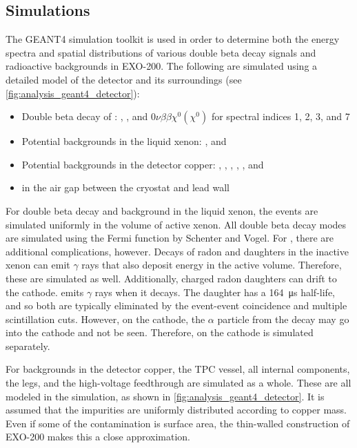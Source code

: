 \documentclass[herrin-thesis.tex]{subfiles}
\begin{document}
\subsection{Simulations}
\label{sec:analysis_simulations}
The GEANT4 simulation toolkit\cite{Agostinelli:2003fk} is used in order to determine both the energy spectra and spatial distributions of various double beta decay signals and radioactive backgrounds in EXO-200. The following are simulated using a detailed model of the detector and its surroundings (see \cref{fig:analysis_geant4_detector}):
\begin{itemize}
\item Double beta decay of :
	\twonu{},
	\zeronu{},
	and \(0\nu\beta\beta\chi^{0}(\chi^{0})\) for spectral indices 1, 2, 3, and 7
\item Potential backgrounds in the liquid xenon:
	,
	and 
\item Potential backgrounds in the detector copper:
	, 
	,
	,
	,
	,
	and 
\item {} in the air gap between the cryostat and lead wall
\end{itemize}

For double beta decay and background in the liquid xenon, the events are simulated uniformly in the volume of active xenon. All double beta decay modes are simulated using the Fermi function by Schenter and Vogel\cite{Schenter:1983uq}. For , there are additional complications, however. Decays of radon and daughters in the inactive xenon can emit \(\gamma\) rays that also deposit energy in the active volume. Therefore, these are simulated as well. Additionally, charged radon daughters can drift to the cathode.  emits \(\gamma\) rays when it decays. The daughter  has a \SI{164}{\micro\s} half-life, and so both are typically eliminated by the event-event coincidence and multiple scintillation cuts. However, on the cathode, the \(\alpha\) particle from the  decay may go into the cathode and not be seen. Therefore,  on the cathode is simulated separately.

For backgrounds in the detector copper, the TPC vessel, all internal components, the legs, and the high-voltage feedthrough are simulated as a whole. These are all modeled in the simulation, as shown in \cref{fig:analysis_geant4_detector}. It is assumed that the impurities are uniformly distributed according to copper mass. Even if some of the contamination is surface area, the thin-walled construction of EXO-200 makes this a close approximation.
\end{document}
